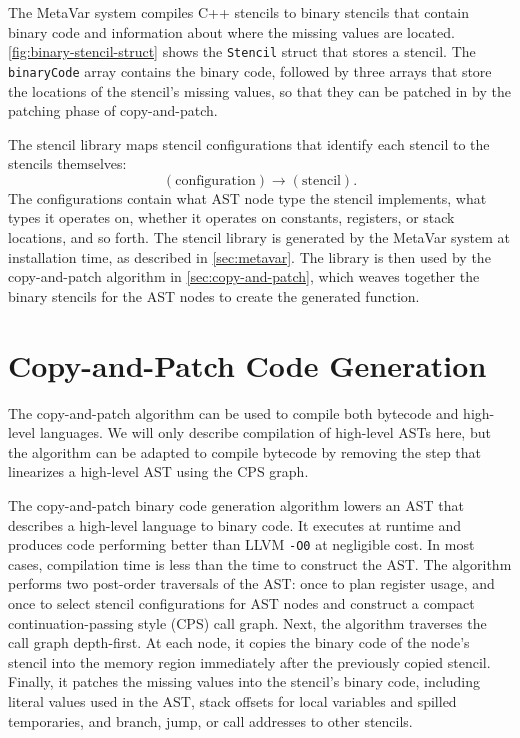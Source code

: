 \documentclass[acmsmall,nonacm,screen]{acmart}\settopmatter{printfolios=true,printccs=true,printacmref=false}
\newcommand{\todo}[1]{{\color{red}(#1)}}
\newcommand{\figref}[1]{\autoref{#1}}
\newcommand{\secref}[1]{\autoref{#1}}
\newcommand\code[1]{\lstinline[mathescape=true,basicstyle=\ttfamily\normalsize]|#1|}
\newcommand{\llvm}{LLVM}
\newcommand{\cp}{copy-and-patch}
\begin{document}
The MetaVar system compiles C++ stencils to binary stencils that contain binary code and information about where the missing values are located. \figref{fig:binary-stencil-struct} shows the \code{Stencil} struct that stores a stencil. The \code{binaryCode} array contains the binary code, followed by three arrays that store the locations of the stencil's missing values, so that they can be patched in by the patching phase of \cp{}.

The stencil library maps stencil configurations that identify each stencil to the stencils themselves: $$(\text{configuration}) \rightarrow (\text{stencil}).$$ The configurations contain what AST node type the stencil implements, what types it operates on, whether it operates on constants, registers, or stack locations, and so forth.
The stencil library is generated by the MetaVar system at installation time, as described in \secref{sec:metavar}. The library is then used by the \cp{} algorithm in \secref{sec:copy-and-patch}, which weaves together the binary stencils for the AST nodes to create the generated function.


\section{Copy-and-Patch Code Generation}
\label{sec:copy-and-patch}

The \cp{} algorithm can be used to compile both bytecode and high-level languages. We will only describe compilation of high-level ASTs here, but the algorithm can be adapted to compile bytecode by removing the step that linearizes a high-level AST using the CPS graph.

The \cp{} binary code generation algorithm lowers an AST that describes a high-level language to binary code. It executes at runtime and produces code performing better than \llvm{} \texttt{-O0} at negligible cost. In most cases, compilation time is less than the time to construct the AST. The algorithm performs two post-order traversals of the AST: once to plan register usage, and once to select stencil configurations for AST nodes and construct a compact continuation-passing style (CPS) call graph. Next, the algorithm traverses the call graph depth-first. At each node, it copies the binary code of the node's stencil into the memory region immediately after the previously copied stencil. Finally, it patches the missing values into the stencil's binary code, including literal values used in the AST, stack offsets for local variables and spilled temporaries, and branch, jump, or call addresses to other stencils.
\end{document}
